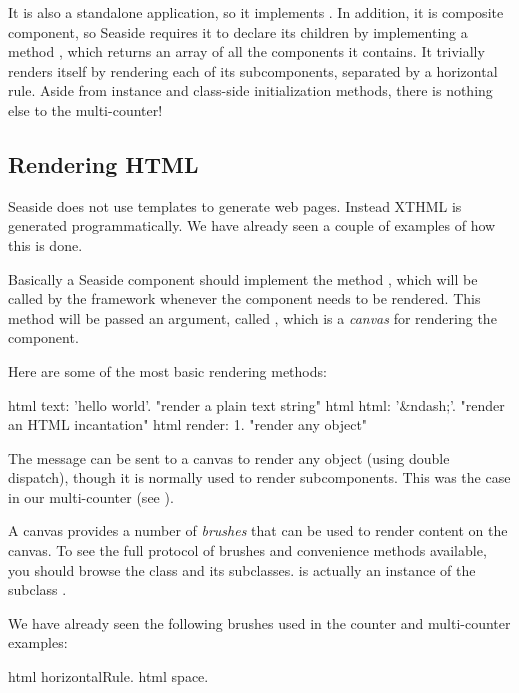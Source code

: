 \documentclass[a4paper,10pt,twoside]{book}
\begin{document}
It is also a standalone application, so it implements .
In addition, it is composite component, so Seaside requires it to declare its children by implementing a method , which returns an array of all the components it contains.
It trivially renders itself by rendering each of its subcomponents, separated by a horizontal rule.
Aside from instance and class-side initialization methods, there is nothing else to the multi-counter!

\subsection{Rendering HTML}

Seaside does not use templates to generate web pages.
Instead XTHML is generated programmatically.
We have already seen a couple of examples of how this is done.

Basically a Seaside component should implement the method , which will be called by the framework whenever the component needs to be rendered.
This method will be passed an argument, called , which is a \emph{canvas} for rendering the component.

Here are some of the most basic rendering methods:
\begin{code}{}
html text: 'hello world'.  "render a plain text string"
html html: '&ndash;'.     "render an HTML incantation"
html render: 1.              "render any object"
\end{code}

The message  can be sent to a canvas to render any object (using double dispatch), though it is normally used to render subcomponents.
This was the case in our multi-counter (see ).

A canvas provides a number of \emph{brushes} that can be used to render content on the canvas.
To see the full protocol of brushes and convenience methods available, you should browse the class  and its subclasses.
 is actually an instance of the subclass .

We have already seen the following brushes used in the counter and multi-counter examples:
\begin{code}{}
html horizontalRule.
html space.
\end{code}
\end{document}
